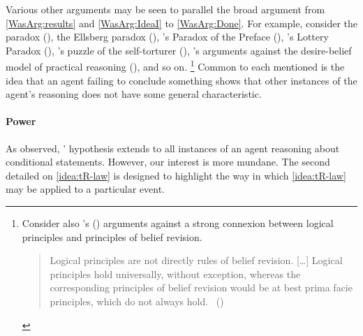 \begin{note}
  Various other arguments may be seen to parallel the broad argument from \ref{WasArg:results} and \ref{WasArg:IdeaI} to \ref{WasArg:Done}.
  For example, consider the \citeauthor{Allais:1979aa} paradox (\cite{Allais:1979aa}),
  the Ellsberg paradox (\cite{Ellsberg:1961aa}), \citeauthor{Makinson:1965aa}'s Paradox of the Preface (\citeyear{Makinson:1965aa}), \citeauthor{Kyburg:1997aa}'s Lottery Paradox (\citeyear{Kyburg:1997aa}), \citeauthor{Quinn:1990aa}'s  puzzle of the self-torturer (\citeyear{Quinn:1990aa}), \citeauthor{Bratman:1981aa}'s arguments against the desire-belief model of practical reasoning (\citeyear{Bratman:1981aa,Bratman:1987aa}), and so on.%
  \footnote{
    Consider also \citeauthor{Harman:1984aa}'s (\citeyear{Harman:1984aa,Harman:1986ux}) arguments against a strong connexion between logical principles and principles of belief revision.

    \begin{quote}
      Logical principles are not directly rules of belief revision.
      [\dots]
      Logical principles hold universally, without exception, whereas the corresponding principles of belief revision would be at best prima facie principles, which do not always hold.%
      \mbox{ }\hfill\mbox{(\citeyear[107--108]{Harman:1984aa})}
    \end{quote}
  }
  Common to each mentioned is the idea that an agent failing to conclude something shows that other instances of the agent's reasoning does not have some general characteristic.
\end{note}

\paragraph*{Power}

\begin{note}
  As observed, \citeauthor{Wason:1966aa}' hypothesis extends to all instances of an agent reasoning about conditional statements.
  However, our interest is more mundane.
  The second detailed  on \autoref{idea:tR-law} is designed to highlight the way in which \autoref{idea:tR-law} may be applied to a particular event.
\end{note}

